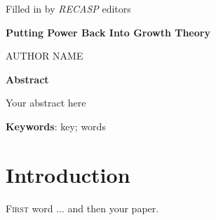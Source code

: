 \documentclass[12pt]{extarticle}
\date{}
\begin{document}

\bigskip
\bigskip
\bigskip
\bigskip

\begin{adjustwidth}{-5em}{0em}



{\selectfont 
\underline{} 


\footnotesize Filled in by \textit{RECASP} editors
}

\end{adjustwidth}



\bigskip
\bigskip
\bigskip
\bigskip

{\selectfont 
\centerline{ \huge{ \textbf{Putting Power Back Into Growth Theory}\Large \footnotemark}}
}




\bigskip
\bigskip


\centerline{ \Large AUTHOR NAME}

\bigskip
\bigskip
\bigskip

\thispagestyle{fancy}

\bigskip
\bigskip
\bigskip


\noindent \textbf{Abstract}


Your abstract here

\bigskip

{\selectfont 
\textbf{Keywords}: key; words}

\bigskip
\bigskip


\newpage

\section{Introduction}

\lettrine[lines=3]{F}{irst } word ... and then your paper. 




\end{document}
